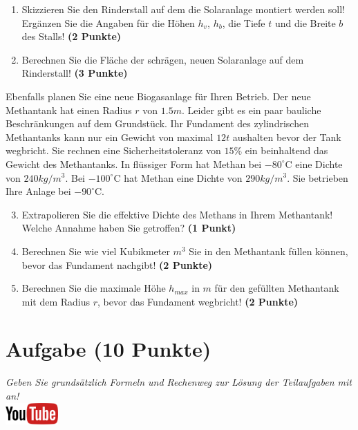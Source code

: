 \documentclass[a4paper, 9pt]{scrartcl}\usepackage[]{graphicx}\usepackage[]{xcolor}
\begin{document}
\begin{enumerate}
\item Skizzieren Sie den Rinderstall auf dem die Solaranlage montiert
  werden soll! Erg{\"a}nzen Sie die Angaben f{\"u}r die H{\"o}hen $h_v$, $h_b$, die
  Tiefe $t$ und die Breite $b$ des Stalls!  \textbf{(2 Punkte)}
\item Berechnen Sie die Fl{\"a}che der schr{\"a}gen, neuen Solaranlage auf dem
  Rinderstall! \textbf{(3 Punkte)}
\end{enumerate}

Ebenfalls planen Sie eine neue Biogasanlage f{\"u}r Ihren Betrieb. Der neue
Methantank hat einen Radius $r$ von $1.5m$. Leider gibt es ein
paar bauliche Beschr{\"a}nkungen auf dem Grundst{\"u}ck. Ihr Fundament des
zylindrischen Methantanks kann nur ein Gewicht von maximal
$12t$ aushalten bevor der Tank wegbricht. Sie rechnen eine
Sicherheitstoleranz von $15\%$ ein beinhaltend das Gewicht des
Methantanks. In fl{\"u}ssiger Form hat
Methan bei $-80^\circ\text{C}$ eine Dichte von
$240kg/m^3$. Bei $-100^\circ\text{C}$ hat Methan eine Dichte
von $290kg/m^3$. Sie betrieben Ihre Anlage bei
$-90^\circ\text{C}$.

\begin{enumerate}
  \setcounter{enumi}{2}
\item Extrapolieren Sie die effektive Dichte des Methans in Ihrem
  Methantank! Welche Annahme haben Sie getroffen? \textbf{(1 Punkt)}
\item Berechnen Sie wie viel Kubikmeter $m^3$ Sie in den Methantank f{\"u}llen
  k{\"o}nnen, bevor das Fundament nachgibt! \textbf{(2 Punkte)}
\item Berechnen Sie die maximale H{\"o}he $h_{max}$ in $m$ f{\"u}r den gef{\"u}llten
  Methantank mit dem Radius $r$, bevor das Fundament wegbricht! \textbf{(2
    Punkte)}
\end{enumerate}

 
\clearpage

\section{Aufgabe \hfill (10 Punkte)}

\textit{Geben Sie grunds{\"a}tzlich Formeln und Rechenweg zur L{\"o}sung der
  Teilaufgaben mit an!} \\[1Ex]

\hfill\href{https://youtu.be/https://youtu.be/k2G52hMIfqk}{\includegraphics[width = 2cm]{img/youtube}} %
\hspace{2Ex}
\end{document}
